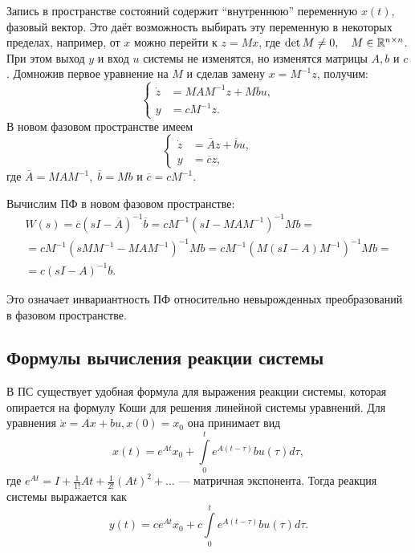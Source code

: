 \documentclass[../../TAU.tex]{subfiles}
\begin{document}
    Запись в пространстве состояний содержит ``внутреннюю'' переменную $x(t)$, фазовый вектор. Это даёт возможность выбирать эту переменную в некоторых пределах, например, от $x$ можно перейти к $z=Mx$, где 
    $\det M \neq 0,\quad M\in\mathbb{R}^{n\times n}$. 
    При этом выход $y$ и вход $u$ системы не изменятся, но изменятся матрицы $A, b$ и $c$. Домножив первое уравнение на $M$ и сделав замену 
    $x=M^{-1}z$, 
    получим:
    $$
        \left\{
        \begin{aligned}
            \dot z &=M AM^{-1}z+Mbu,\\
            y&= cM^{-1}z.
        \end{aligned}
        \right.
    $$
    В новом фазовом пространстве имеем
    $$
        \left\{
        \begin{aligned}
            \dot z &= \overline{A}z+\overline{b}u,\\
            y&= \overline{c}z,
        \end{aligned}
        \right.
    $$
    где 
    $\overline{A} = M AM^{-1},\; \overline{b} = Mb$ 
    и 
    $\overline{c}= cM^{-1}$.

    Вычислим ПФ в новом фазовом пространстве:
    \begin{multline*}
        W(s) = \overline{c}(sI-\overline{A})^{-1}\overline{b} = cM^{-1}(sI-MAM^{-1})^{-1}Mb = \\
        = c M^{-1} (sMM^{-1} - MAM^{-1})^{-1}Mb = c M^{-1}(M(sI-A)M^{-1})^{-1}Mb = \\
        =c(sI-A)^{-1}b.
    \end{multline*}

    Это означает инвариантность ПФ относительно невырожденных преобразований в фазовом пространстве.

\subsection{Формулы вычисления реакции системы}

    В ПС существует удобная формула для выражения реакции системы, которая опирается на формулу Коши для решения линейной системы уравнений. Для уравнения 
    $\dot x = Ax + bu, x(0) = x_0$ 
    она принимает вид
    $$
        x(t) = e^{At}x_0 + \int\limits_{0}^{t} e^{A(t-\tau)}bu(\tau)d\tau,
    $$
    где 
    $e^{At} = I+\frac{1}{1!}At + \frac{1}{2!}(At)^{2} + \ldots$ --- 
    матричная экспонента.
    Тогда реакция системы выражается как
    $$
        y(t) = ce^{At}x_0 + c\int\limits_{0}^{t} e^{A(t-\tau)}bu(\tau)d\tau.
    $$
\end{document}
